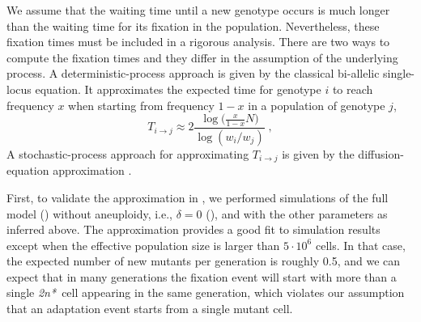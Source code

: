 \documentclass[12pt]{extarticle}
\newtheorem{remark}{Remark}
\newcommand{\eumt}{\emph{2n*}}
\begin{document}
We assume that the waiting time until a new genotype occurs is much longer than the waiting time for its fixation in the population. Nevertheless, these fixation times must be included in a rigorous analysis. There are two ways to compute the fixation times and they differ in the assumption of the underlying process.
A deterministic-process approach is given by the classical bi-allelic single-locus equation.
It approximates the expected time for genotype $i$ to reach frequency $x$ when starting from frequency $1-x$ in a population of genotype $j$,
\begin{equation} \label{eq:T_fix_x}
 T_{i \to j} \approx 2\frac{\log{\big(\frac{x}{1-x}N\big)}}{\log(w_i/w_j)} \;,
\end{equation} 
A stochastic-process approach for approximating $T_{i \to j}$ is given by the diffusion-equation approximation \citep[eq.~17]{Kimura1969a}.


First, to validate the approximation in , we performed simulations of the full model () without aneuploidy, i.e., $\delta=0$ (), and with the other parameters as inferred above. The approximation provides a good fit to simulation results except when the effective population size is larger than $5\cdot 10^6$ cells. In that case, the expected number of new mutants per generation is roughly 0.5, and  we can expect that in many generations the fixation event will start with more than a single \eumt\ cell appearing in the same generation, which violates our assumption that an adaptation event starts from a single mutant cell.
\end{document}
